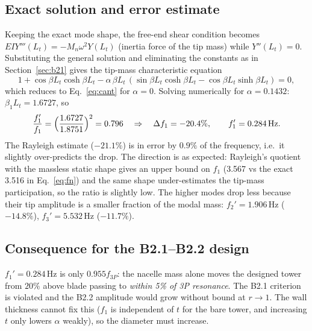 \documentclass[11pt,a4paper]{article}
\begin{document}
\subsection*{Exact solution and error estimate}
Keeping the exact mode shape, the free-end shear condition becomes $EIY'''(L_t)=-M_n\omega^2Y(L_t)$ (inertia force of the tip mass) while $Y''(L_t)=0$. Substituting the general solution and eliminating the constants as in Section~\ref{sec:b21} gives the tip-mass characteristic equation
\begin{equation}
1+\cos\beta L_t\cosh\beta L_t-\alpha\,\beta L_t\,(\sin\beta L_t\cosh\beta L_t-\cos\beta L_t\sinh\beta L_t)=0,
\label{eq:tipmass}
\end{equation}
which reduces to Eq.~\eqref{eq:cant} for $\alpha=0$. Solving numerically for $\alpha=0.1432$: $\beta_1L_t=1.6727$, so
\[
\frac{f_1'}{f_1}=\Bigl(\frac{1.6727}{1.8751}\Bigr)^2=0.796\quad\Rightarrow\quad \Delta f_1=-20.4\%,\qquad f_1'=0.284\,\mathrm{Hz}.
\]
The Rayleigh estimate ($-21.1\%$) is in error by $0.9\%$ of the frequency, i.e.\ it slightly over-predicts the drop. The direction is as expected: Rayleigh's quotient with the massless static shape gives an upper bound on $f_1$ (3.567 vs the exact 3.516 in Eq.~\eqref{eq:fn}) and the same shape under-estimates the tip-mass participation, so the ratio is slightly low. The higher modes drop less because their tip amplitude is a smaller fraction of the modal mass: $f_2'=1.906\,\mathrm{Hz}$ ($-14.8\%$), $f_3'=5.532\,\mathrm{Hz}$ ($-11.7\%$).

\subsection*{Consequence for the B2.1--B2.2 design}
$f_1'=0.284\,\mathrm{Hz}$ is only $0.955f_{3P}$: the nacelle mass alone moves the designed tower from $20\%$ above blade passing to \emph{within 5\% of 3P resonance}. The B2.1 criterion is violated and the B2.2 amplitude would grow without bound at $r\to1$. The wall thickness cannot fix this ($f_1$ is independent of $t$ for the bare tower, and increasing $t$ only lowers $\alpha$ weakly), so the diameter must increase.
\end{document}
